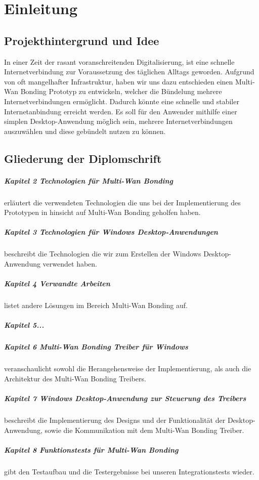 \chapter{Einleitung}
\label{cha:Einleitung}

\section{Projekthintergrund und Idee}
In einer Zeit der rasant voranschreitenden Digitalisierung, ist eine schnelle Internetverbindung zur Voraussetzung des täglichen Alltags geworden. Aufgrund von oft mangelhafter Infrastruktur, haben wir uns dazu entschieden einen Multi-Wan Bonding Prototyp zu entwickeln, welcher die Bündelung mehrere Internetverbindungen ermöglicht. Dadurch könnte eine schnelle und stabiler Internetanbindung erreicht werden. Es soll für den Anwender mithilfe einer simplen Desktop-Anwendung möglich sein, mehrere Internetverbindungen auszuwählen und diese gebündelt nutzen zu können.
\section{Gliederung der Diplomschrift}
\paragraph{Kapitel 2 Technologien für Multi-Wan Bonding}erläutert die verwendeten Technologien die uns bei der Implementierung des Prototypen in hinsicht auf Multi-Wan Bonding geholfen haben.
\paragraph{Kapitel 3 Technologien für Windows Desktop-Anwendungen}beschreibt die Technologien die wir zum Erstellen der Windows Desktop-Anwendung verwendet haben.
\paragraph{Kapitel 4 Verwandte Arbeiten}listet andere Lösungen im Bereich Multi-Wan Bonding auf. 
\paragraph{Kapitel 5...}
\paragraph{Kapitel 6 Multi-Wan Bonding Treiber für Windows}veranschaulicht sowohl die Herangehensweise der Implementierung, als auch die Architektur des Multi-Wan Bonding Treibers.
\paragraph{Kapitel 7 Windows Desktop-Anwendung zur Steuerung des Treibers}beschreibt die Implementierung des Designs und der Funktionalität der Desktop-Anwendung, sowie die Kommunikation mit dem Multi-Wan Bonding Treiber.
\paragraph{Kapitel 8 Funktionstests für Multi-Wan Bonding}gibt den Testaufbau und die Testergebnisse bei unseren Integrationstests wieder.